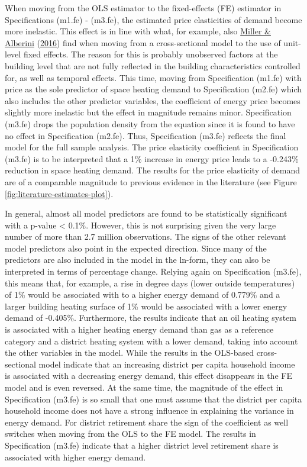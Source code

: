 \documentclass[12pt,twoside]{reedthesis}
\begin{document}
When moving from the OLS estimator to the fixed-effects (FE) estimator in Specifications (m1.fe) - (m3.fe), the estimated price elasticities of demand become more inelastic. This effect is in line with what, for example, also \protect\hyperlink{ref-miller_alberini16}{Miller \& Alberini} (\protect\hyperlink{ref-miller_alberini16}{2016}) find when moving from a cross-sectional model to the use of unit-level fixed effects. The reason for this is probably unobserved factors at the building level that are not fully reflected in the building characteristics controlled for, as well as temporal effects. This time, moving from Specification (m1.fe) with price as the sole predictor of space heating demand to Specification (m2.fe) which also includes the other predictor variables, the coefficient of energy price becomes slightly more inelastic but the effect in magnitude remains minor. Specification (m3.fe) drops the population density from the equation since it is found to have no effect in Specification (m2.fe). Thus, Specification (m3.fe) reflects the final model for the full sample analysis. The price elasticity coefficient in Specification (m3.fe) is to be interpreted that a 1\% increase in energy price leads to a -0.243\% reduction in space heating demand. The results for the price elasticity of demand are of a comparable magnitude to previous evidence in the literature (see Figure \ref{fig:literature-estimates-plot}).

In general, almost all model predictors are found to be statistically significant with a p-value \textless{} 0.1\%. However, this is not surprising given the very large number of more than 2.7 million observations. The signs of the other relevant model predictors also point in the expected direction. Since many of the predictors are also included in the model in the ln-form, they can also be interpreted in terms of percentage change. Relying again on Specification (m3.fe), this means that, for example, a rise in degree days (lower outside temperatures) of 1\% would be associated with to a higher energy demand of 0.779\% and a larger building heating surface of 1\% would be associated with a lower energy demand of -0.405\%. Furthermore, the results indicate that an oil heating system is associated with a higher heating energy demand than gas as a reference category and a district heating system with a lower demand, taking into account the other variables in the model. While the results in the OLS-based cross-sectional model indicate that an increasing district per capita household income is associated with a decreasing energy demand, this effect disappears in the FE model and is even reversed. At the same time, the magnitude of the effect in Specification (m3.fe) is so small that one must assume that the district per capita household income does not have a strong influence in explaining the variance in energy demand. For district retirement share the sign of the coefficient as well switches when moving from the OLS to the FE model. The results in Specification (m3.fe) indicate that a higher district level retirement share is associated with higher energy demand.
\end{document}
